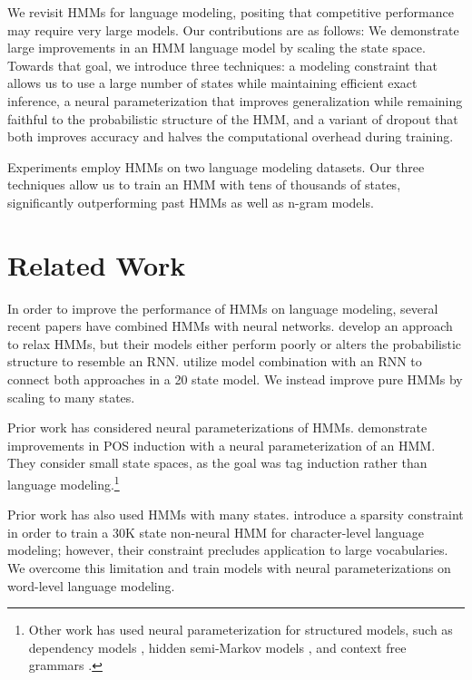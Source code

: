 \documentclass[11pt,a4paper]{article}
\begin{document}
We revisit HMMs for language modeling,
positing that competitive performance may require very large models. 
Our contributions are as follows:
We demonstrate large improvements in an HMM language model by scaling the state space.
Towards that goal, we introduce three techniques:
a modeling constraint that allows us to use a large number of states 
while maintaining efficient exact inference,
a neural parameterization that improves
generalization while remaining faithful to the
probabilistic structure of the HMM,
and a variant of dropout that both improves accuracy
and halves the computational overhead during training. 

Experiments employ HMMs on two language modeling datasets.
Our three techniques allow us to train an HMM with tens of thousands of states,
significantly outperforming past HMMs as well as n-gram models.

\section{Related Work}
\label{sec:rw}
In order to improve the performance of HMMs on language modeling,
several recent papers have combined HMMs with neural networks.
\citet{buys2018hmm} develop an approach to relax HMMs,
but their models either perform poorly or alters the probabilistic structure to resemble an RNN. 
\citet{krakovna2016hmm} utilize model combination with an RNN to connect both approaches in a
20 state model.
We instead improve pure HMMs by scaling to many states.

Prior work has considered neural parameterizations of HMMs. 
\citet{tran2016hmm} demonstrate improvements in POS induction with a
neural parameterization of an HMM.
They consider small state spaces,
as the goal was tag induction rather than language modeling.\footnote{
Other work has used neural parameterization for structured models, such as 
dependency models \citep{han2017dependency},
hidden semi-Markov models \citep{wiseman2018hsmm},
and context free grammars \citep{kim2019cpcfg}.
}

Prior work has also used HMMs with many states.
\citet{dedieu2019learning} introduce a sparsity constraint
in order to train a 30K state non-neural HMM for character-level language modeling;
however, their constraint precludes application to large vocabularies.
We overcome this limitation and train models with 
neural parameterizations on word-level language modeling.
\end{document}
